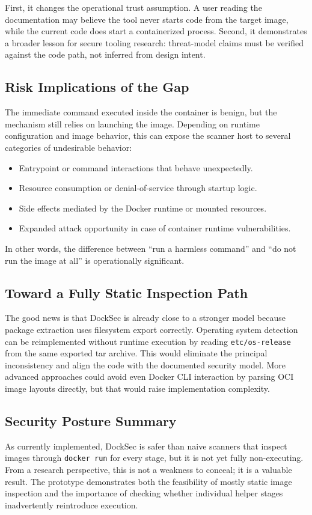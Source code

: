 \documentclass[12pt,draftclsnofoot,onecolumn]{IEEEtran}
\begin{document}
First, it changes the operational trust assumption. A user reading the documentation may believe the tool never starts code from the target image, while the current code does start a containerized process. Second, it demonstrates a broader lesson for secure tooling research: threat-model claims must be verified against the code path, not inferred from design intent.

\subsection{Risk Implications of the Gap}
The immediate command executed inside the container is benign, but the mechanism still relies on launching the image. Depending on runtime configuration and image behavior, this can expose the scanner host to several categories of undesirable behavior:
\begin{itemize}
  \item Entrypoint or command interactions that behave unexpectedly.
  \item Resource consumption or denial-of-service through startup logic.
  \item Side effects mediated by the Docker runtime or mounted resources.
  \item Expanded attack opportunity in case of container runtime vulnerabilities.
\end{itemize}

In other words, the difference between ``run a harmless command'' and ``do not run the image at all'' is operationally significant.

\subsection{Toward a Fully Static Inspection Path}
The good news is that DockSec is already close to a stronger model because package extraction uses filesystem export correctly. Operating system detection can be reimplemented without runtime execution by reading \texttt{etc/os-release} from the same exported tar archive. This would eliminate the principal inconsistency and align the code with the documented security model. More advanced approaches could avoid even Docker CLI interaction by parsing OCI image layouts directly, but that would raise implementation complexity.

\subsection{Security Posture Summary}
As currently implemented, DockSec is safer than naive scanners that inspect images through \texttt{docker run} for every stage, but it is not yet fully non-executing. From a research perspective, this is not a weakness to conceal; it is a valuable result. The prototype demonstrates both the feasibility of mostly static image inspection and the importance of checking whether individual helper stages inadvertently reintroduce execution.
\end{document}
